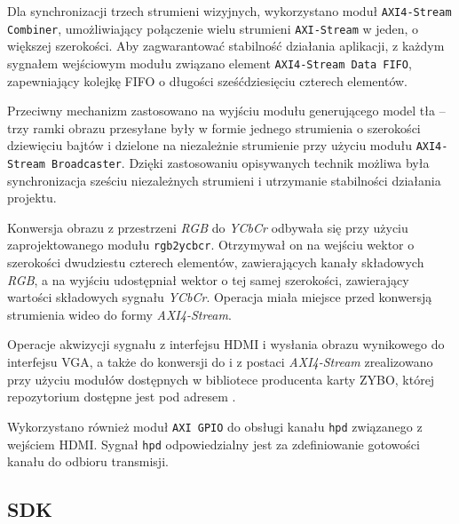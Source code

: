 Dla  synchronizacji trzech strumieni wizyjnych, wykorzystano moduł \texttt{AXI4-Stream Combiner}, umożliwiający połączenie wielu strumieni \texttt{AXI-Stream} w jeden, o większej szerokości. Aby zagwarantować stabilność działania aplikacji, z każdym sygnałem wejściowym modułu związano element \texttt{AXI4-Stream Data FIFO}, zapewniający kolejkę FIFO o długości sześćdziesięciu czterech elementów.

Przeciwny mechanizm zastosowano na wyjściu modułu generującego model tła -- trzy ramki obrazu przesyłane były w formie jednego strumienia o szerokości dziewięciu bajtów i dzielone na niezależnie strumienie przy użyciu modułu \texttt{AXI4-Stream Broadcaster}. Dzięki zastosowaniu opisywanych technik możliwa była synchronizacja sześciu niezależnych strumieni i utrzymanie stabilności działania projektu.

Konwersja obrazu z przestrzeni \emph{RGB} do \emph{YCbCr} odbywała się przy użyciu zaprojektowanego modułu \texttt{rgb2ycbcr}. Otrzymywał on na wejściu wektor o szerokości dwudziestu czterech elementów, zawierających kanały składowych \emph{RGB}, a na wyjściu udostępniał wektor o tej samej szerokości, zawierający wartości składowych sygnału \emph{YCbCr}. Operacja miała miejsce przed konwersją strumienia wideo do formy \emph{AXI4-Stream}.

Operacje akwizycji sygnału z interfejsu HDMI i wysłania obrazu wynikowego do interfejsu VGA, a także do konwersji do i z postaci \emph{AXI4-Stream} zrealizowano przy użyciu modułów dostępnych w bibliotece producenta karty ZYBO, której repozytorium dostępne jest pod adresem \cite{vivado-library}.

Wykorzystano również moduł \texttt{AXI GPIO} do obsługi kanału \texttt{hpd} związanego z wejściem HDMI. Sygnał \texttt{hpd} odpowiedzialny jest za zdefiniowanie gotowości kanału do odbioru transmisji.


\subsection{SDK}

